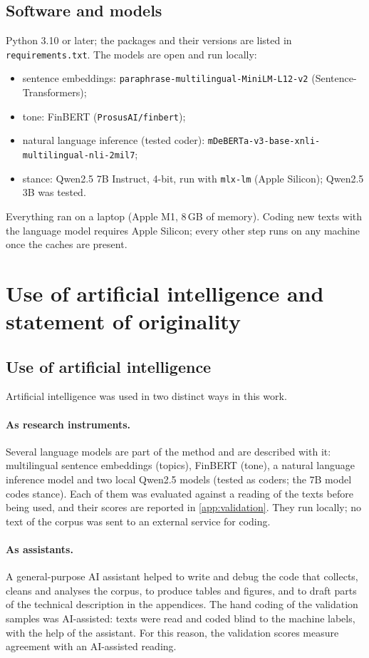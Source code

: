 \documentclass[11pt,a4paper]{article}
\begin{document}
\subsection{Software and models}
Python 3.10 or later; the packages and their versions are listed in \texttt{requirements.txt}. The models are open and run locally:
\begin{itemize}
\item sentence embeddings: \texttt{paraphrase-multilingual-MiniLM-L12-v2} (Sentence-Transformers);
\item tone: FinBERT (\texttt{ProsusAI/finbert});
\item natural language inference (tested coder): \texttt{mDeBERTa-v3-base-xnli-multilingual-nli-2mil7};
\item stance: Qwen2.5 7B Instruct, 4-bit, run with \texttt{mlx-lm} (Apple Silicon); Qwen2.5 3B was tested.
\end{itemize}
Everything ran on a laptop (Apple M1, 8\,GB of memory). Coding new texts with the language model requires Apple Silicon; every other step runs on any machine once the caches are present.

\section{Use of artificial intelligence and statement of originality}\label{app:ai}

\subsection{Use of artificial intelligence}
Artificial intelligence was used in two distinct ways in this work.

\paragraph{As research instruments.} Several language models are part of the method and are described with it: multilingual sentence embeddings (topics), FinBERT (tone), a natural language inference model and two local Qwen2.5 models (tested as coders; the 7B model codes stance). Each of them was evaluated against a reading of the texts before being used, and their scores are reported in \cref{app:validation}. They run locally; no text of the corpus was sent to an external service for coding.

\paragraph{As assistants.} A general-purpose AI assistant helped to write and debug the code that collects, cleans and analyses the corpus, to produce tables and figures, and to draft parts of the technical description in the appendices. The hand coding of the validation samples was AI-assisted: texts were read and coded blind to the machine labels, with the help of the assistant. For this reason, the validation scores measure agreement with an AI-assisted reading.
\end{document}
